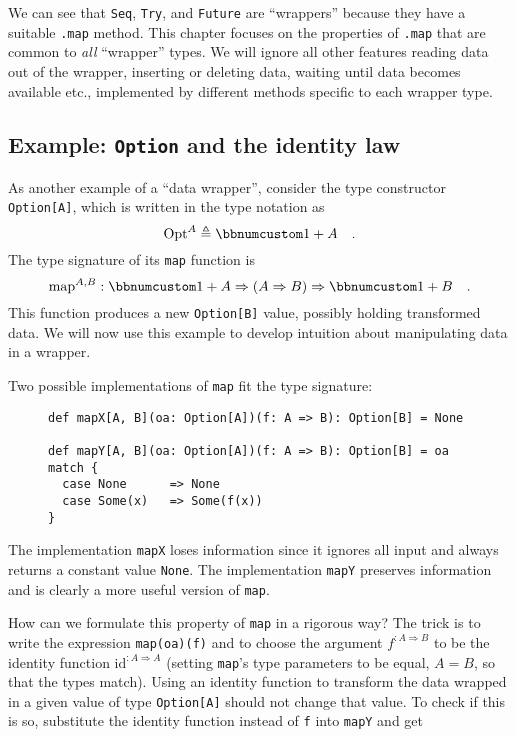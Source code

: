 We can see that \lstinline!Seq!, \lstinline!Try!, and \lstinline!Future!
are ``wrappers'' because they have a suitable \lstinline!.map!
method. This chapter focuses on the properties of \lstinline!.map!
that are common to \emph{all} ``wrapper'' types. We will ignore
all other features \textendash{} reading data out of the wrapper,
inserting or deleting data, waiting until data becomes available etc.,
\textendash{} implemented by different methods specific to each wrapper
type.

\subsection{Example: \texttt{Option} and the identity law\label{subsec:f-Example:-Option-and}}

As another example of a ``data wrapper'', consider the type constructor
\lstinline!Option[A]!, which is written in the type notation as 
\[
\text{Opt}^{A}\triangleq\bbnum 1+A\quad.
\]
The type signature of its \lstinline!map! function is
\[
\text{map}^{A,B}:\bbnum 1+A\Rightarrow\left(A\Rightarrow B\right)\Rightarrow\bbnum 1+B\quad.
\]
This function produces a new \lstinline!Option[B]! value, possibly
holding transformed data. We will now use this example to develop
intuition about manipulating data in a wrapper.

Two possible implementations of \lstinline!map! fit the type signature:

\begin{wrapfigure}{l}{0.65\columnwidth}%
\vspace{-0.3\baselineskip}
\begin{lstlisting}
def mapX[A, B](oa: Option[A])(f: A => B): Option[B] = None

def mapY[A, B](oa: Option[A])(f: A => B): Option[B] = oa match {
  case None      => None
  case Some(x)   => Some(f(x))
}
\end{lstlisting}
\vspace{-1\baselineskip}
\end{wrapfigure}%
The implementation \lstinline!mapX! loses information
since it ignores all input and always returns a constant value \lstinline!None!.
The implementation \lstinline!mapY! preserves information and is
clearly a more useful version of \lstinline!map!. 

How can we formulate this property of \lstinline!map! in a rigorous
way? The trick is to write the expression \lstinline!map(oa)(f)!
and to choose the argument $f^{:A\Rightarrow B}$ to be the identity
function $\text{id}^{:A\Rightarrow A}$ (setting \lstinline!map!'s
type parameters to be equal, $A=B$, so that the types match). Using
an identity function to transform the data wrapped in a given value
of type \lstinline!Option[A]! should not change that value. To check
if this is so, substitute the identity function instead of \lstinline!f!
into \lstinline!mapY! and get

